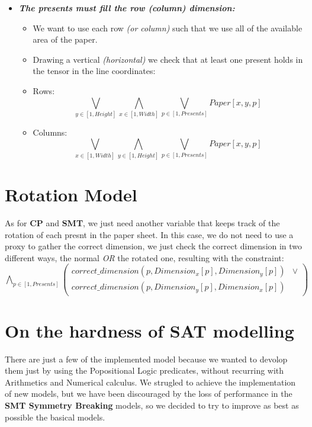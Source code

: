 \begin{itemize}
    \item \textbf{\textit{The presents must fill the row (column) dimension:}}
        \begin{itemize}
            \item[] We want to use each row \textit{(or column)} such that we use all of the available area of the paper.
            \item[] Drawing a vertical \textit{(horizontal)} we check that at least one present holds in the tensor in the line coordinates:
            \item[] Rows: \begin{equation*}\bigvee_{y \in [1, Height]} \bigwedge_{x \in [1, Width]} \bigvee_{p \in [1, Presents]} Paper[x, y, p]\end{equation*}
            \item[] Columns: \begin{equation*}\bigvee_{x \in [1, Width]} \bigwedge_{y \in [1, Height]} \bigvee_{p \in [1, Presents]} Paper[x, y, p]\end{equation*}
        \end{itemize}
\end{itemize}



\newpage
\section{Rotation Model}
As for \textbf{CP} and \textbf{SMT}, we just need another variable that keeps track of the rotation of each presnt in the paper sheet.
In this case, we do not need to use a proxy to gather the correct dimension, we just check the correct dimension in two different ways,
the normal \textit{OR} the rotated one, resulting with the constraint: 
$
    \bigwedge_{p \in [1, Presents]} (
    \begin{matrix}
        correct\_dimension(p, Dimension_x[p], Dimension_y[p]) & \vee \\
        correct\_dimension(p, Dimension_y[p], Dimension_x[p]) &
    \end{matrix}
    )
$



\newpage
\section{On the hardness of SAT modelling}
There are just a few of the implemented model because we wanted to devolop them just by using the Popositional Logic predicates, without recurring with Arithmetics
and Numerical calculus. We strugled to achieve the implementation of new models, but we have been discouraged by the loss of performance in the \textbf{SMT Symmetry Breaking} models,
so we decided to try to improve as best as possible the basical models.\\

